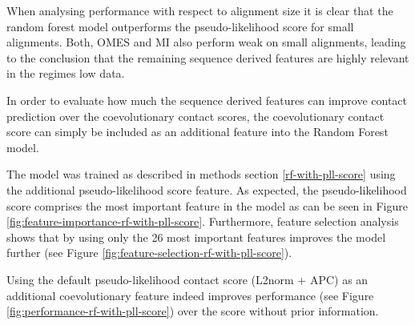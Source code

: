 \documentclass[12pt,a4paper,twoside]{book}
\theoremstyle{definition}
\theoremstyle{definition}
\theoremstyle{remark}
\begin{document}
When analysing performance with respect to alignment size it is clear
that the random forest model outperforms the pseudo-likelihood score for
small alignments. Both, OMES and MI also perform weak on small
alignments, leading to the conclusion that the remaining sequence
derived features are highly relevant in the regimes low data.

In order to evaluate how much the sequence derived features can improve
contact prediction over the coevolutionary contact scores, the
coevolutionary contact score can simply be included as an additional
feature into the Random Forest model.

The model was trained as described in methods section
\ref{rf-with-pll-score} using the additional pseudo-likelihood score
feature. As expected, the pseudo-likelihood score comprises the most
important feature in the model as can be seen in Figure
\ref{fig:feature-importance-rf-with-pll-score}. Furthermore, feature
selection analysis shows that by using only the 26 most important
features improves the model further (see Figure
\ref{fig:feature-selection-rf-with-pll-score}).

Using the default pseudo-likelihood contact score (L2norm + APC) as an
additional coevolutionary feature indeed improves performance (see
Figure \ref{fig:performance-rf-with-pll-score}) over the score without
prior information.
\end{document}
